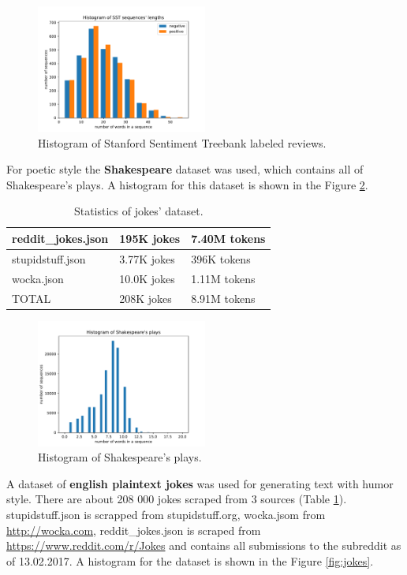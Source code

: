 \begin{figure}[hb]
  \centering
  \includegraphics[width=0.5\textwidth]{figures/sst.pdf}
  \caption{Histogram of Stanford Sentiment Treebank labeled reviews.}
  \label{fig:sst}
\end{figure}

For poetic style the \textbf{Shakespeare} dataset was used, which contains all of Shakespeare's plays. A histogram for this dataset is shown in the Figure \ref{fig:shakespeare}.

\begin{table}
\centering
 \begin{tabular}{|p{4cm}|p{3cm}|p{3cm}|} 
 \hline
 reddit\_jokes.json & 195K jokes & 7.40M tokens \\
 \hline
 stupidstuff.json & 3.77K jokes & 396K tokens \\
 \hline
 wocka.json & 10.0K jokes & 1.11M tokens \\
 \hline
 TOTAL & 208K jokes & 8.91M tokens \\
 \hline
 \end{tabular}
 \caption{Statistics of jokes' dataset.}
\label{tab:jokes}
\end{table}

\begin{figure}[H]
  \centering
  \includegraphics[width=0.5\textwidth]{figures/shakespeare.pdf}
  \caption{Histogram of Shakespeare's plays.}
  \label{fig:shakespeare}
\end{figure}

A dataset of \textbf{english plaintext jokes} was used for generating text with humor style. There are about 208 000 jokes scraped from 3 sources (Table \ref{tab:jokes}). stupidstuff.json is scrapped from stupidstuff.org, wocka.jsom from \url{http://wocka.com}, reddit\_jokes.json is scraped from \url{https://www.reddit.com/r/Jokes} and contains all submissions to the subreddit as of 13.02.2017. A histogram for the dataset is shown in the Figure \ref{fig:jokes}.

